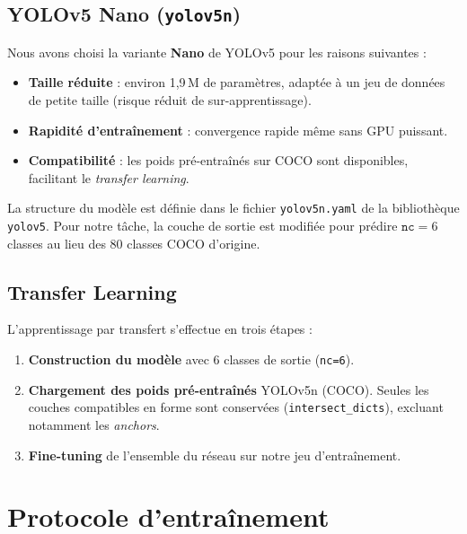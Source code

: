 \documentclass[12pt,a4paper]{article}
\begin{document}
\subsection{YOLOv5 Nano (\texttt{yolov5n})}

Nous avons choisi la variante \textbf{Nano} de YOLOv5 pour les raisons suivantes :

\begin{itemize}
    \item \textbf{Taille réduite} : environ 1,9\,M de paramètres, adaptée à un jeu de données de petite taille (risque réduit de sur-apprentissage).
    \item \textbf{Rapidité d'entraînement} : convergence rapide même sans GPU puissant.
    \item \textbf{Compatibilité} : les poids pré-entraînés sur COCO sont disponibles, facilitant le \emph{transfer learning}.
\end{itemize}

La structure du modèle est définie dans le fichier \texttt{yolov5n.yaml} de la bibliothèque \texttt{yolov5}. Pour notre tâche, la couche de sortie est modifiée pour prédire $\texttt{nc} = 6$ classes au lieu des 80 classes COCO d'origine.

\subsection{Transfer Learning}

L'apprentissage par transfert s'effectue en trois étapes :

\begin{enumerate}
    \item \textbf{Construction du modèle} avec 6 classes de sortie (\texttt{nc=6}).
    \item \textbf{Chargement des poids pré-entraînés} YOLOv5n (COCO). Seules les couches compatibles en forme sont conservées (\texttt{intersect\_dicts}), excluant notamment les \emph{anchors}.
    \item \textbf{Fine-tuning} de l'ensemble du réseau sur notre jeu d'entraînement.
\end{enumerate}

\section{Protocole d'entraînement}\label{sec:training}
\end{document}

